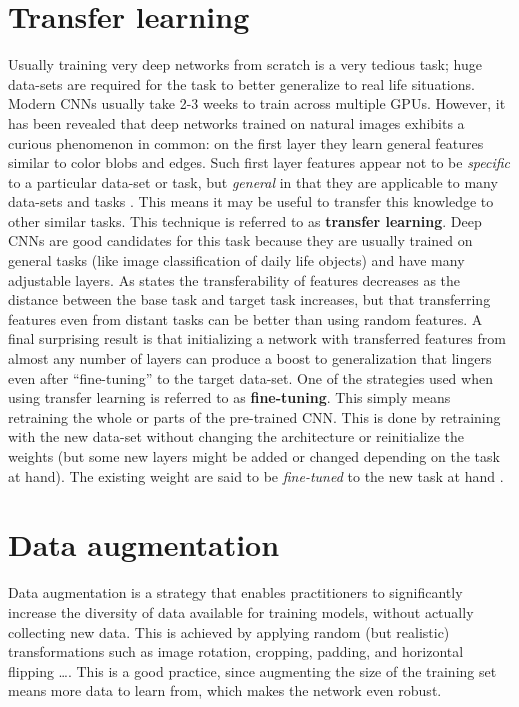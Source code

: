 \section{Transfer learning}\label{tl}
Usually training very deep networks from scratch is a very tedious task; huge data-sets are required for the task to better generalize to real life situations. Modern CNNs usually take 2-3 weeks to train across multiple GPUs. However, it has been revealed that deep networks trained on natural images exhibits a curious phenomenon in common: on the first layer they learn general features similar to color blobs and edges. Such first layer features appear not to be \emph{specific} to a particular data-set or task, but \emph{general} in that they are applicable to many data-sets and tasks \cite{Transfer}. This means it may be useful to transfer this knowledge to other similar tasks. This technique is referred to as \textbf{transfer learning}. Deep CNNs are good candidates for this task because they are usually trained on general tasks (like image classification of daily life objects) and have many adjustable layers. As \cite{Transfer} states the transferability of features decreases as the distance between the base task and target task increases, but that transferring features even from distant tasks can be better than using random features. A final surprising result is that initializing a network with transferred features from almost any number of layers can produce a boost to generalization that lingers even after ``fine-tuning'' to the target data-set. One of the strategies used when using transfer learning is referred to as \textbf{fine-tuning}.
This simply means retraining the whole or parts of the pre-trained CNN. This is done by retraining with the new data-set without changing the architecture or reinitialize the weights (but some new layers might be added or changed depending on the task at hand). The existing weight are said to be \emph{fine-tuned} to the new task at hand \cite{ntnu}.

\section{Data augmentation} \label{data_aug}
Data augmentation is a strategy that enables practitioners to significantly increase the diversity of data available for training models, without actually collecting new data. This is achieved by applying random (but realistic) transformations such as image rotation, cropping, padding, and horizontal flipping \ldots. This is a good practice, since augmenting the size of the training set means more data to learn from, which makes the network even robust.
